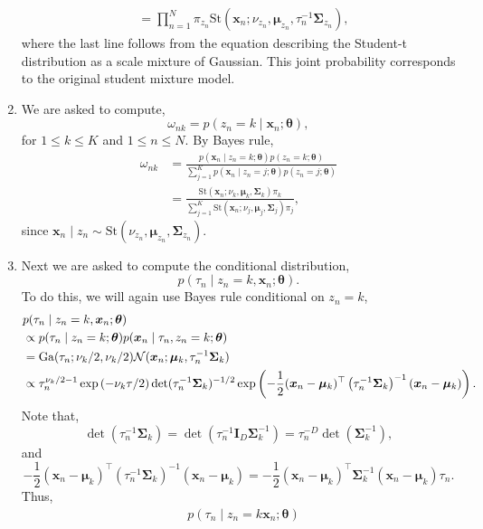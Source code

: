 \begin{enumerate}[label = (\alph*)]
\begin{align*}
        &=\prod_{n=1}^N \pi_{z_n}\mathrm{St}\left(\bm{x}_n; \nu_{z_n}, \bm{\mu}_{z_n}, \tau_{n}^{-1}\bm{\Sigma}_{z_n}\right),
    \end{align*}
    where the last line follows from the equation describing the Student-t distribution as a scale mixture of Gaussian. This joint probability corresponds to the original student mixture model.
    \item We are asked to compute,
    \[\omega_{nk} = p(z_n = k \mid \bm{x}_n;\bm{\theta}), \]
    for $1 \le k \le K$ and $1 \le n \le N$. By Bayes rule,
    \begin{align*}
        \omega_{nk} &= \frac{p(\bm{x}_n \mid z_n = k; \bm{\theta})p(z_n = k ;\bm{\theta})}{\sum_{j=1}^K p(\bm{x}_n \mid z_n = j; \bm{\theta})p(z_n = j ;\bm{\theta})}\\
        &= \frac{\mathrm{St}(\bm{x}_n ; \nu_k,\bm{\mu}_k, \bm{\Sigma}_k)\pi_k}{\sum_{j=1}^K \mathrm{St}(\bm{x}_n ; \nu_j,\bm{\mu}_j, \bm{\Sigma}_j)\pi_j},
    \end{align*}
    since $\bm{x}_n \mid z_n \sim \mathrm{St}\left(\nu_{z_n},\bm{\mu}_{z_n},\bm{\Sigma}_{z_n}\right)$.
    \item Next we are asked to compute the conditional distribution,
    \[p(\tau_n \mid z_n=k, \bm{x}_n; \bm{\theta}). \]
    To do this, we will again use Bayes rule conditional on $z_n=k$,
    \begin{align*}
        &p(\tau_n \mid z_n=k, \bm{x}_n; \bm{\theta})\\
        &\propto p(\tau_n \mid z_n=k;\bm{\theta})p(\bm{x}_n \mid \tau_n,z_n=k;\bm{\theta})\\
        &= \mathrm{Ga}(\tau_n;\nu_k/2, \nu_k/2){\mathcal N}(\bm{x}_n; \bm{\mu}_k, \tau_n^{-1}\bm{\Sigma}_k)\\
        &\propto \tau_n^{\nu_k/2 - 1}\exp\left(-\nu_k\tau/2\right)\det(\tau_n^{-1}\bm{\Sigma}_k)^{-1/2}\exp\left(-\frac{1}{2}(\bm{x}_n-\bm{\mu}_k)^\top\left(\tau_n^{-1}\bm{\Sigma}_k\right)^{-1}(\bm{x}_n - \bm{\mu}_k)\right).
    \end{align*}
    Note that,
    \[\det(\tau_n^{-1}\bm{\Sigma}_k) = \det(\tau_n^{-1}\bm{I}_D\bm{\Sigma}_k^{-1}) = \tau_n^{-D}\det(\bm{\Sigma}_k^{-1}), \]
    and
    \[-\frac{1}{2}(\bm{x}_n-\bm{\mu}_k)^\top\left(\tau_n^{-1}\bm{\Sigma}_k\right)^{-1}(\bm{x}_n - \bm{\mu}_k) =  - \frac{1}{2}(\bm{x}_n-\bm{\mu}_k)^\top\bm{\Sigma}_k^{-1}(\bm{x}_n - \bm{\mu}_k)\tau_n.\]
    Thus,
    \begin{align*}
        &p(\tau_n\mid z_n=k \bm{x}_n;\bm{\theta})\\

\end{align*}
\end{enumerate}
